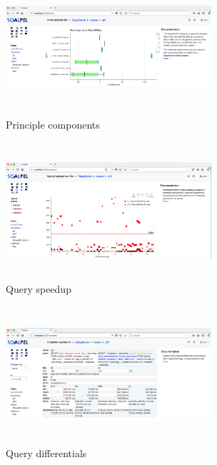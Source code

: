 \documentclass{cidr-2019}
\begin{document}
\begin{figure}[t!]
\centering
\includegraphics[height=2in,width=3in]{Figures/components2.png}
\caption{Principle components
	\label{fig:components}}
\end{figure}


\begin{figure}[t!]
\centering
\includegraphics[height=2in,width=3in]{Figures/speedup3.png}
\caption{Query speedup
	\label{fig:speedup2}}
\end{figure}

\begin{figure}[t!]
\centering
\includegraphics[height=2in,width=3in]{Figures/compare2.png}
\caption{Query differentials
	\label{fig:differential}}
\end{figure}
\end{document}
